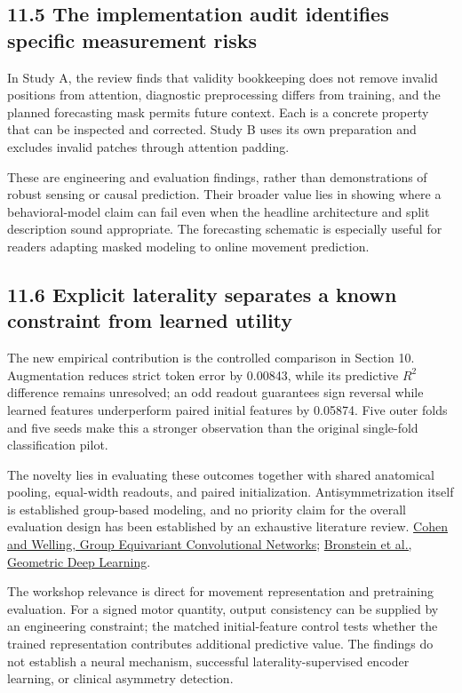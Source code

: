 \documentclass[11pt,letterpaper]{article}
\begin{document}
\subsection{11.5 The implementation audit identifies specific
measurement
risks}\label{the-implementation-audit-identifies-specific-measurement-risks}

In Study A, the review finds that validity bookkeeping does not remove
invalid positions from attention, diagnostic preprocessing differs from
training, and the planned forecasting mask permits future context. Each
is a concrete property that can be inspected and corrected. Study B uses
its own preparation and excludes invalid patches through attention
padding.

These are engineering and evaluation findings, rather than
demonstrations of robust sensing or causal prediction. Their broader
value lies in showing where a behavioral-model claim can fail even when
the headline architecture and split description sound appropriate. The
forecasting schematic is especially useful for readers adapting masked
modeling to online movement prediction.

\subsection{11.6 Explicit laterality separates a known constraint from
learned
utility}\label{explicit-laterality-separates-a-known-constraint-from-learned-utility}

The new empirical contribution is the controlled comparison in Section
10. Augmentation reduces strict token error by 0.00843, while its
predictive \(R^2\) difference remains unresolved; an odd readout
guarantees sign reversal while learned features underperform paired
initial features by 0.05874. Five outer folds and five seeds make this a
stronger observation than the original single-fold classification pilot.

The novelty lies in evaluating these outcomes together with shared
anatomical pooling, equal-width readouts, and paired initialization.
Antisymmetrization itself is established group-based modeling, and no
priority claim for the overall evaluation design has been established by
an exhaustive literature review.
\href{https://proceedings.mlr.press/v48/cohenc16.html}{Cohen and
Welling, Group Equivariant Convolutional Networks};
\href{https://arxiv.org/abs/2104.13478}{Bronstein et al., Geometric Deep
Learning}.

The workshop relevance is direct for movement representation and
pretraining evaluation. For a signed motor quantity, output consistency
can be supplied by an engineering constraint; the matched
initial-feature control tests whether the trained representation
contributes additional predictive value. The findings do not establish a
neural mechanism, successful laterality-supervised encoder learning, or
clinical asymmetry detection.
\end{document}
